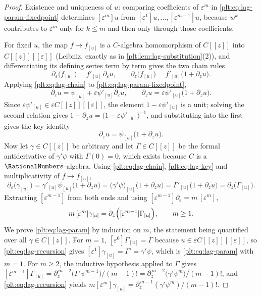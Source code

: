 \documentclass[11pt,oneside]{article}
\theoremstyle{plain}
\theoremstyle{definition}
\theoremstyle{remark}
\begin{document}
\begin{proof}
Existence and uniqueness of \(u\): comparing coefficients of \(\varepsilon^m\)
in \cref{plt:eq:lag-param-fixedpoint} determines \([\varepsilon^m]u\) from
\([\varepsilon^1]u,\ldots,[\varepsilon^{m-1}]u\), because \(w^k\) contributes to
\(\varepsilon^m\) only for \(k\le m\) and then only through those coefficients.

For fixed \(u\), the map \(f\mapsto f_{[u]}\) is a \(C\)-algebra homomorphism
of \(C[[z]]\) into \(C[[z]][[\varepsilon]]\) (Leibniz, exactly as in
\cref{plt:lem:lag-substitution}(2)), and differentiating its defining series
term by term gives the two chain rules
\begin{equation}
\label{plt:eq:lag-chain}
  \partial_\varepsilon\bigl(f_{[u]}\bigr)=f'_{[u]}\,\partial_\varepsilon u,
  \qquad
  \partial_z\bigl(f_{[u]}\bigr)=f'_{[u]}\bigl(1+\partial_zu\bigr).
\end{equation}
Applying \cref{plt:eq:lag-chain} to \cref{plt:eq:lag-param-fixedpoint},
\[
  \partial_\varepsilon u=\psi_{[u]}+\varepsilon\psi'_{[u]}\partial_\varepsilon u,
  \qquad
  \partial_zu=\varepsilon\psi'_{[u]}\bigl(1+\partial_zu\bigr).
\]
Since \(\varepsilon\psi'_{[u]}\in\varepsilon C[[z]][[\varepsilon]]\), the element
\(1-\varepsilon\psi'_{[u]}\) is a unit; solving the second relation gives
\(1+\partial_zu=\bigl(1-\varepsilon\psi'_{[u]}\bigr)^{-1}\), and substituting into
the first gives the key identity
\begin{equation}
\label{plt:eq:lag-key}
  \partial_\varepsilon u=\psi_{[u]}\bigl(1+\partial_zu\bigr).
\end{equation}
Now let \(\gamma\in C[[z]]\) be arbitrary and let \(\Gamma\in C[[z]]\) be the
formal antiderivative of \(\gamma'\psi\) with \(\Gamma(0)=0\), which exists
because \(C\) is a \(\RationalNumbers\)-algebra.  Using
\cref{plt:eq:lag-chain}, \cref{plt:eq:lag-key} and multiplicativity of
\(f\mapsto f_{[u]}\),
\[
  \partial_\varepsilon\bigl(\gamma_{[u]}\bigr)
  =\gamma'_{[u]}\psi_{[u]}\bigl(1+\partial_zu\bigr)
  =\bigl(\gamma'\psi\bigr)_{[u]}\bigl(1+\partial_zu\bigr)
  =\Gamma'_{[u]}\bigl(1+\partial_zu\bigr)
  =\partial_z\bigl(\Gamma_{[u]}\bigr).
\]
Extracting \([\varepsilon^{m-1}]\) from both ends and using
\([\varepsilon^{m-1}]\partial_\varepsilon=m\,[\varepsilon^m]\),
\begin{equation}
\label{plt:eq:lag-recursion}
  m\,[\varepsilon^m]\gamma_{[u]}
  =\partial_z\Bigl([\varepsilon^{m-1}]\Gamma_{[u]}\Bigr),
  \qquad m\ge1 .
\end{equation}
We prove \cref{plt:eq:lag-param} by induction on \(m\), the statement being
quantified over all \(\gamma\in C[[z]]\).  For \(m=1\),
\([\varepsilon^0]\Gamma_{[u]}=\Gamma\) because \(u\in\varepsilon
C[[z]][[\varepsilon]]\), so \cref{plt:eq:lag-recursion} gives
\([\varepsilon^1]\gamma_{[u]}=\Gamma'=\gamma'\psi\), which is
\cref{plt:eq:lag-param} with \(m=1\).  For \(m\ge2\), the inductive hypothesis
applied to \(\Gamma\) gives
\([\varepsilon^{m-1}]\Gamma_{[u]}=\partial_z^{\,m-2}\bigl(\Gamma'\psi^{m-1}\bigr)/(m-1)!
=\partial_z^{\,m-2}\bigl(\gamma'\psi^{m}\bigr)/(m-1)!\), and
\cref{plt:eq:lag-recursion} yields
\(m[\varepsilon^m]\gamma_{[u]}=\partial_z^{\,m-1}(\gamma'\psi^m)/(m-1)!\).
\end{proof}
\end{document}

